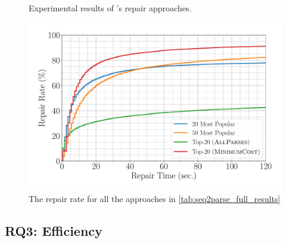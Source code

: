 \begin{figure}[t]
  \centering
  \begin{minipage}[c]{0.46\linewidth}
    \centering
    \caption{Experimental results of \toolname's repair approaches.}
    \label{tab:seq2parse_full_results}
  \end{minipage}
  \begin{minipage}[c]{0.53\linewidth}
    \centering
    \includegraphics[width=\linewidth]{tool-repair-rate.pdf}
    \caption{The repair rate for all the approaches in
    \autoref{tab:seq2parse_full_results}}
    \label{fig:tool-repair-rate}
  \end{minipage}
\end{figure}

\subsection{RQ3: Efficiency}
\label{sec:eval:efficiency}

